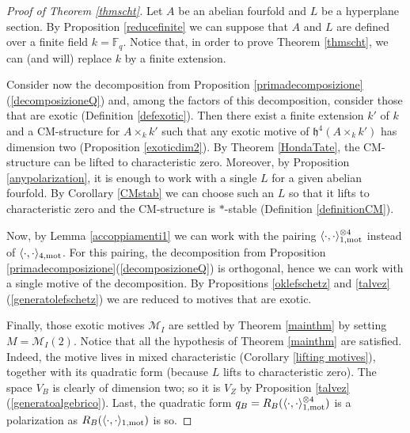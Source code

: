 \documentclass[11pt]{amsart}
\begin{document}
\begin{proof}[Proof of Theorem \ref{thmscht}]
Let $A$ be an abelian fourfold and $L$ be a hyperplane section. By Proposition \ref{reducefinite} we can suppose that $A$ and $L$ are defined over a finite field $k=\mathbb{F}_q$. Notice that, in order to prove Theorem \ref{thmscht}, we can (and will) replace $k$ by a finite extension.

Consider now the decomposition from Proposition \ref{primadecomposizione}(\ref{decomposizioneQ}) and, among the factors of this decomposition, consider 
those that are exotic (Definition \ref{defexotic}). Then there exist a finite extension $k'$ of $k$ and a  CM-structure for $A\times_k k'$ such that any exotic motive  of $\mathfrak{h}^{4}(A\times_k k')$ has dimension two (Proposition \ref{exoticdim2}).  By Theorem \ref{HondaTate}, the CM-structure can be lifted    to characteristic zero.  Moreover, by Proposition \ref{anypolarization}, it is enough to work with a single $L$ for a given abelian fourfold. By Corollary \ref{CMstab} we can choose such an $L$ so that it lifts to characteristic zero and the CM-structure is $*$-stable (Definition \ref{definitionCM}).

 
Now, by Lemma \ref{accoppiamenti1} we can work with the pairing $\langle \cdot, \cdot \rangle_{1,\mathrm{mot}}^{\otimes 4}$ instead of $\langle \cdot, \cdot \rangle_{4,\mathrm{mot}}$. For this pairing, the decomposition from Proposition \ref{primadecomposizione}(\ref{decomposizioneQ}) is orthogonal, hence we can work with a single motive of the decomposition. By Propositions \ref{oklefschetz} and \ref{talvez}(\ref{generatolefschetz}) we are reduced to motives that are exotic.

Finally, those exotic motives $\mathcal{M}_I$ are settled by Theorem \ref{mainthm} by setting $M=\mathcal{M}_I(2)$. Notice that all the hypothesis of Theorem \ref{mainthm} are satisfied. Indeed, the motive lives in mixed characteristic (Corollary \ref{lifting motives}), together with its quadratic form (because $L$ lifts to characteristic zero). The space $V_B$ is clearly of dimension two; so it is $V_Z$ by   Proposition  \ref{talvez}(\ref{generatoalgebrico}).  Last, the quadratic form $q_B=R_B(\langle \cdot, \cdot \rangle_{1,\mathrm{mot}}^{\otimes 4})$ is a polarization as $R_B(\langle \cdot, \cdot \rangle_{1,\mathrm{mot}})$ is so.
\end{proof}
\end{document}
